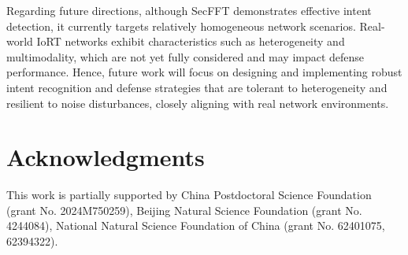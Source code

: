 \documentclass[lettersize,journal]{IEEEtran}
\begin{document}
Regarding future directions, although SecFFT demonstrates effective intent detection, it currently targets relatively homogeneous network scenarios. Real-world IoRT networks exhibit characteristics such as heterogeneity and multimodality, which are not yet fully considered and may impact defense performance. Hence, future work will focus on designing and implementing robust intent recognition and defense strategies that are tolerant to heterogeneity and resilient to noise disturbances, closely aligning with real network environments.



\section*{Acknowledgments}
This work is partially supported by China Postdoctoral Science Foundation (grant No. 2024M750259), Beijing Natural Science Foundation (grant No. 4244084), National Natural Science Foundation of China (grant No. 62401075, 62394322).











 
\end{document}
